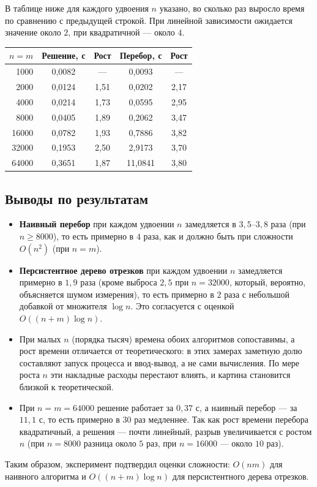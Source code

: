 В таблице ниже для каждого удвоения $n$ указано, во сколько раз выросло время по сравнению с предыдущей строкой.
При линейной зависимости ожидается значение около $2$, при квадратичной --- около $4$.

\begin{center}
\begin{tabular}{|r|c|c|c|c|}
\hline
\rowcolor{lightgray}
$n = m$ & Решение, с & Рост & Перебор, с & Рост \\
\hline
1000  & 0,0082 & ---  & 0,0093  & ---  \\
\hline
2000  & 0,0124 & 1,51 & 0,0202  & 2,17 \\
\hline
4000  & 0,0214 & 1,73 & 0,0595  & 2,95 \\
\hline
8000  & 0,0405 & 1,89 & 0,2062  & 3,47 \\
\hline
16000 & 0,0782 & 1,93 & 0,7886  & 3,82 \\
\hline
32000 & 0,1953 & 2,50 & 2,9173  & 3,70 \\
\hline
64000 & 0,3651 & 1,87 & 11,0841 & 3,80 \\
\hline
\end{tabular}
\end{center}

\subsection*{Выводы по результатам}
\begin{itemize}
\item \textbf{Наивный перебор} при каждом удвоении $n$ замедляется в $3{,}5$--$3{,}8$ раза (при $n \ge 8000$),
то есть примерно в $4$ раза, как и должно быть при сложности $O(n^2)$ (при $n = m$).
\item \textbf{Персистентное дерево отрезков} при каждом удвоении $n$ замедляется примерно в $1{,}9$ раза
(кроме выброса $2{,}5$ при $n = 32000$, который, вероятно, объясняется шумом измерения), то есть примерно в $2$ раза с
небольшой добавкой от множителя $\log n$. Это согласуется с оценкой $O((n + m)\log n)$.
\item При малых $n$ (порядка тысяч) времена обоих алгоритмов сопоставимы, а рост времени отличается от теоретического: в этих
замерах заметную долю составляют запуск процесса и ввод-вывод, а не сами вычисления. По мере роста $n$ эти накладные расходы
перестают влиять, и картина становится близкой к теоретической.
\item При $n = m = 64000$ решение работает за $0{,}37$ с, а наивный перебор --- за $11{,}1$ с, то есть примерно в $30$ раз
медленнее. Так как рост времени перебора квадратичный, а решения --- почти линейный, разрыв увеличивается с
ростом $n$ (при $n = 8000$ разница около $5$ раз, при $n = 16000$ --- около $10$ раз).
\end{itemize}

Таким образом, эксперимент подтвердил оценки сложности: $O(nm)$ для наивного алгоритма и $O((n + m)\log n)$ для персистентного
дерева отрезков.

\pagebreak